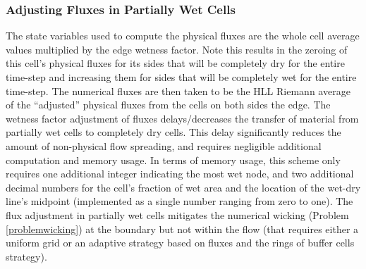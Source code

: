 \documentclass[letterpaper,10pt]{article}
\begin{document}
\subsubsection{Adjusting Fluxes in Partially Wet Cells} \label{adjustfluxes}
The state variables used to compute the physical fluxes are the whole
cell average values multiplied by the edge wetness factor.  Note this 
results in the zeroing of this cell's physical fluxes for its sides 
that will be completely dry for the entire time-step and increasing 
them for sides that will be completely wet for the entire time-step.   
The numerical fluxes are then taken to be the HLL Riemann average of 
the ``adjusted'' physical fluxes from the cells on both sides the edge.  
The wetness factor adjustment of fluxes delays/decreases the transfer 
of material from partially wet cells to completely dry cells.  This 
delay significantly reduces the amount of non-physical flow spreading, 
and requires negligible additional computation and memory usage.  In 
terms of memory usage, this scheme only requires one additional
integer indicating the most wet node, and two additional decimal 
numbers for the cell's fraction of wet area and the location of the 
wet-dry line's midpoint (implemented as a single number ranging from 
zero to one).  The flux adjustment in partially wet cells mitigates
the numerical wicking (Problem \ref{problemwicking}) at the boundary but not within the flow (that
requires either a uniform grid or an adaptive strategy based on
fluxes and the rings of buffer cells strategy).
% 
% 
% 
\end{document}
